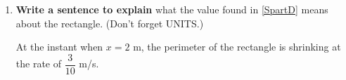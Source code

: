 \documentclass{ximera}
\begin{document}
\begin{problem}
\begin{enumerate}
			
			

			\item \textbf{Write a sentence to explain} what the value found in \ref{SpartD} means about the rectangle. (Don't forget UNITS.)
\begin{explanation}
					At the instant when $x = 2$ m, the perimeter of the rectangle is shrinking at the rate of $\dfrac{3}{10}$ m/s.
				\end{explanation}
		\end{enumerate}
		
\end{problem}
\end{document}
